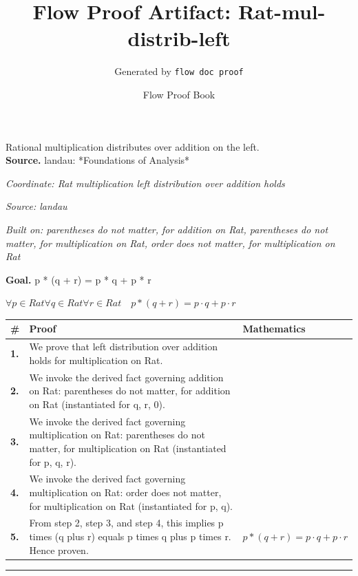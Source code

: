 \documentclass[11pt]{article}
\title{Flow Proof Artifact: Rat-mul-distrib-left}
\author{Generated by \texttt{flow doc proof}}
\date{Flow Proof Book}
\theoremstyle{definition}
\begin{document}
\maketitle
Rational multiplication distributes over addition on the left.\\[0.5em]
\textbf{Source.} landau: *Foundations of Analysis*\\[0.5em]
\bigskip
{}\par
\smallskip\noindent\textit{Coordinate: Rat \cdot multiplication \cdot left distribution over addition holds}\par
\smallskip\noindent\textit{Source: landau}\par
\smallskip\noindent\textit{Built on: parentheses do not matter, for addition on Rat, parentheses do not matter, for multiplication on Rat, order does not matter, for multiplication on Rat}\par
\medskip
\noindent\textbf{Goal.} p * (q + r) = p * q + p * r\par
\noindent$\displaystyle \forall p \in Rat \forall q \in Rat \forall r \in Rat\quad p * (q + r) = p \cdot q + p \cdot r$\par
\medskip
\noindent
\begin{tabular}{@{} >{\raggedright\arraybackslash}p{} >{\raggedright\arraybackslash}p{} >{\raggedleft\arraybackslash}p{} @{}}
\textbf{\#} & \textbf{Proof} & \textbf{Mathematics} \\
\midrule
\textbf{1.} & We prove that left distribution over addition holds for multiplication on Rat. & \\[0.45em]
\textbf{2.} & We invoke the derived fact governing addition on Rat: parentheses do not matter, for addition on Rat (instantiated for q, r, 0). & \\[0.45em]
\textbf{3.} & We invoke the derived fact governing multiplication on Rat: parentheses do not matter, for multiplication on Rat (instantiated for p, q, r). & \\[0.45em]
\textbf{4.} & We invoke the derived fact governing multiplication on Rat: order does not matter, for multiplication on Rat (instantiated for p, q). & \\[0.45em]
\textbf{5.} & From step 2, step 3, and step 4, this implies p times (q plus r) equals p times q plus p times r. Hence proven. & $\displaystyle p * (q + r) = p \cdot q + p \cdot r$ \\[0.45em]
\bottomrule
\end{tabular}
\label{thm:Rat-multiplication-left_distribution_over_addition_holds}
\par\medskip\hrule
\end{document}
